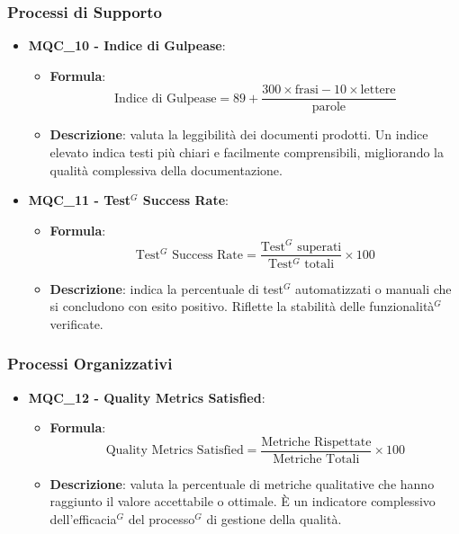 \subsubsection{Processi di Supporto}
\begin{itemize}
\item \textbf{MQC\_10 - Indice di Gulpease}:
    \begin{itemize}
        \item \textbf{Formula}:
        \[
            \text{Indice di Gulpease} =
            89 + \frac{300 \times \text{frasi} - 10 \times \text{lettere}}{\text{parole}}
        \]
        \item \textbf{Descrizione}: valuta la leggibilità dei documenti prodotti. Un indice elevato indica testi più chiari e facilmente comprensibili, migliorando la qualità complessiva della documentazione.
    \end{itemize}

\item \textbf{MQC\_11 - Test$^G$ Success Rate}:
    \begin{itemize}
        \item \textbf{Formula}:
        \[
            \text{Test$^G$ Success Rate} =
            \frac{\text{Test$^G$ superati}}{\text{Test$^G$ totali}} \times 100
        \]
        \item \textbf{Descrizione}: indica la percentuale di test$^G$ automatizzati o manuali che si concludono con esito positivo. Riflette la stabilità delle funzionalità$^G$ verificate.
    \end{itemize}
\end{itemize}

\subsubsection{Processi Organizzativi}
\begin{itemize}
\item \textbf{MQC\_12 - Quality Metrics Satisfied}:
    \begin{itemize}
        \item \textbf{Formula}:
        \[
            \text{Quality Metrics Satisfied} =
            \frac{\text{Metriche Rispettate}}{\text{Metriche Totali}} \times 100
        \]
        \item \textbf{Descrizione}: valuta la percentuale di metriche qualitative che hanno raggiunto il valore accettabile o ottimale. È un indicatore complessivo dell’efficacia$^G$ del processo$^G$ di gestione della qualità.
    \end{itemize}
\end{itemize}

